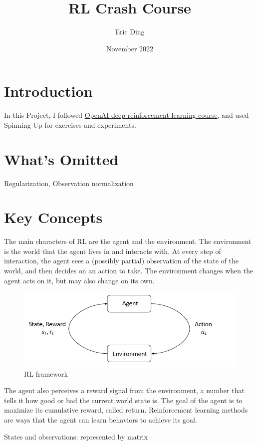 \documentclass{article}
\title{RL Crash Course}
\author{Eric Ding}
\date{November 2022}
\begin{document}
\maketitle

\section{Introduction}
    In this Project, I followed \href{https://spinningup.openai.com/en/latest/index.html}{OpenAI deep reinforcement learning course}, and used Spinning Up for exercises and experiments.
    

\section{What's Omitted}
    Regularization, Observation normalization

\section{Key Concepts}
    The main characters of RL are the agent and the environment. The environment is the world that the agent lives in and interacts with. At every step of interaction, the agent sees a (possibly partial) observation of the state of the world, and then decides on an action to take. The environment changes when the agent acts on it, but may also change on its own.
    \begin{figure}[H]
        \includegraphics[width=\linewidth]{rl_diagram_transparent_bg.png}
        \caption{RL framework}
        \label{fig:rl}
      \end{figure}

    The agent also perceives a reward signal from the environment, a number that tells it how good or bad the current world state is. The goal of the agent is to maximize its cumulative reward, called return. Reinforcement learning methods are ways that the agent can learn behaviors to achieve its goal.

    States and observations: represented by matrix
\end{document}
